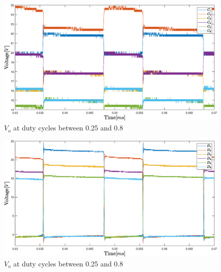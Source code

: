 \begin{figure}[H]
	\begin{center}
   \includegraphics[width=\textwidth]{figures/06Testing/botcap60per.eps}
	\end{center}
	\vspace{-8mm}
	\caption{$V_o$ at duty cycles between 0.25 and 0.8}
	\label{fig:V_OUT_ALL}
\end{figure}
\begin{figure}[H]
	\begin{center}
   \includegraphics[width=\textwidth]{figures/06Testing/botdio60per.eps}
	\end{center}
	\vspace{-8mm}
	\caption{$V_o$ at duty cycles between 0.25 and 0.8}
	\label{fig:V_OUT_ALL}
\end{figure}

